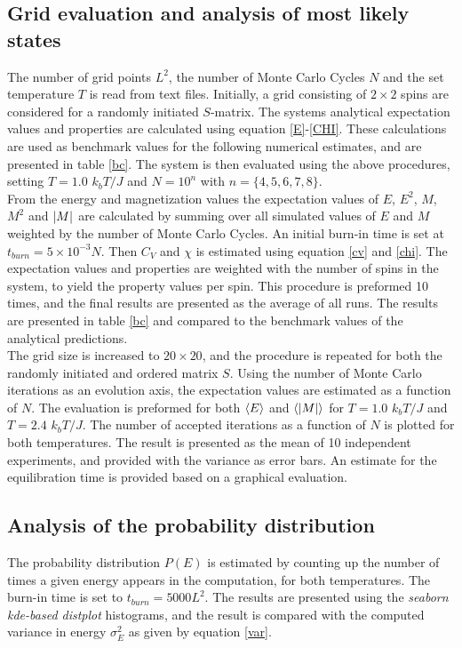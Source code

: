 \documentclass[%
reprint,nofootinbib,
amsmath,amssymb,
aps,
]{revtex4-1}
\begin{document}
\subsection*{Grid evaluation and analysis of most likely states} \noindent 
The number of grid points $L^2$, the number of Monte Carlo Cycles $N$ and the set temperature $T$ is read from text files. Initially, a grid consisting of $2\times 2$ spins are considered for a randomly initiated $S$-matrix. The systems analytical expectation values and properties are calculated using equation \ref{E}-\ref{CHI}. These calculations are used as benchmark values for the following numerical estimates, and are presented in table \ref{bc}. The system is then evaluated using the above procedures, setting $T = 1.0$ $k_bT/J$  and $N = 10^n$ with $n = \{4,5,6,7,8\}$. \\ \indent 
 From the energy and magnetization values the expectation values of $E$, $E^2$, $M$, $M^2$ and $\abs{M}$ are calculated by summing over all simulated values of $E$ and $M$ weighted by the number of Monte Carlo Cycles. An initial burn-in time is set at $t_{burn} = 5\times10^{-3}N$. Then $C_V$ and $\chi$ is estimated using equation  \ref{cv} and \ref{chi}. The expectation values and properties are weighted with the number of spins in the system, to yield the property values per spin. This procedure is preformed 10 times, and the final results are presented as the average of all runs. The results are presented in table \ref{bc} and compared to the benchmark values of the analytical predictions. \\ \indent 
The grid size is increased to $20\times20$, and the procedure is repeated for both the randomly initiated and ordered matrix $S$. Using the number of Monte Carlo iterations as an evolution axis, the expectation values are estimated as a function of $N$. The evaluation is preformed for both $\expval{E}$ and $\expval{\abs{M}}$ for  $T = 1.0$ $k_bT/J$ and $T = 2.4$ $k_bT/J$. The number of accepted iterations as a function of $N$ is plotted for both temperatures. The result is presented as the mean of 10 independent experiments, and provided with the variance as error bars. An estimate for the equilibration time is provided based on a graphical evaluation. 
\subsection*{Analysis of the probability distribution} \noindent
The probability distribution $P(E)$ is estimated by counting up the number of times a given energy appears in the computation, for both temperatures. The burn-in time is set to $t_{burn} = 5000L^2$. The results are presented using the \textit{seaborn kde-based distplot} histograms, and the result is compared with the computed variance in energy $\sigma_E^2$ as given by equation \ref{var}. 
\end{document}

